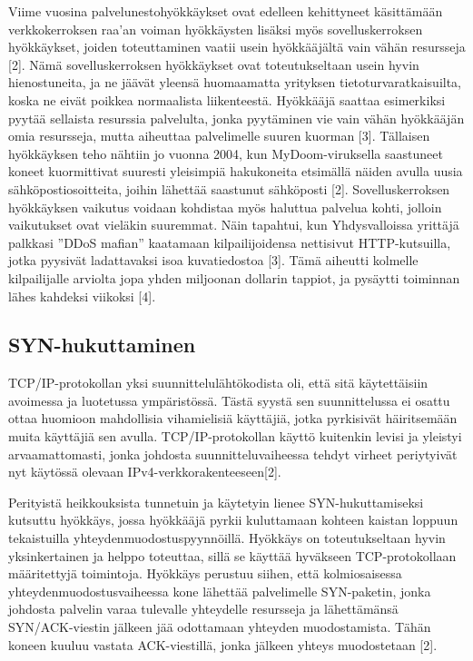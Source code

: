 Viime vuosina palvelunestohyökkäykset ovat edelleen kehittyneet
käsittämään verkkokerroksen raa’an voiman hyökkäysten lisäksi myös
sovelluskerroksen hyökkäykset, joiden toteuttaminen vaatii usein
hyökkääjältä vain vähän resursseja [2]. Nämä sovelluskerroksen
hyökkäykset ovat toteutukseltaan usein hyvin hienostuneita, ja ne
jäävät yleensä huomaamatta yrityksen tietoturvaratkaisuilta, koska ne
eivät poikkea normaalista liikenteestä. Hyökkääjä saattaa esimerkiksi
pyytää sellaista resurssia palvelulta, jonka pyytäminen vie vain vähän
hyökkääjän omia resursseja, mutta aiheuttaa palvelimelle suuren
kuorman [3]. Tällaisen hyökkäyksen teho nähtiin jo vuonna 2004, kun
MyDoom-viruksella saastuneet koneet kuormittivat suuresti yleisimpiä
hakukoneita etsimällä näiden avulla uusia sähköpostiosoitteita, joihin
lähettää saastunut sähköposti [2]. Sovelluskerroksen hyökkäyksen
vaikutus voidaan kohdistaa myös haluttua palvelua kohti, jolloin
vaikutukset ovat vieläkin suuremmat. Näin tapahtui, kun Yhdysvalloissa
yrittäjä palkkasi ”DDoS mafian” kaatamaan kilpailijoidensa nettisivut
HTTP-kutsuilla, jotka pyysivät ladattavaksi isoa kuvatiedostoa
[3]. Tämä aiheutti kolmelle kilpailijalle arviolta jopa yhden
miljoonan dollarin tappiot, ja pysäytti toiminnan lähes kahdeksi
viikoksi [4].

\subsection{SYN-hukuttaminen}

TCP/IP-protokollan yksi suunnittelulähtökodista oli, että sitä
käytettäisiin avoimessa ja luotetussa ympäristössä. Tästä syystä sen
suunnittelussa ei osattu ottaa huomioon mahdollisia vihamielisiä
käyttäjiä, jotka pyrkisivät häiritsemään muita käyttäjiä sen
avulla. TCP/IP-protokollan käyttö kuitenkin levisi ja yleistyi
arvaamattomasti, jonka johdosta suunnitteluvaiheessa tehdyt virheet
periytyivät nyt käytössä olevaan IPv4-verkkorakenteeseen[2].

Perityistä heikkouksista tunnetuin ja käytetyin lienee
SYN-hukuttamiseksi kutsuttu hyökkäys, jossa hyökkääjä pyrkii
kuluttamaan kohteen kaistan loppuun tekaistuilla
yhteydenmuodostuspyynnöillä. Hyökkäys on toteutukseltaan hyvin
yksinkertainen ja helppo toteuttaa, sillä se käyttää hyväkseen
TCP-protokollaan määritettyjä toimintoja. Hyökkäys perustuu siihen,
että kolmiosaisessa yhteydenmuodostusvaiheessa kone lähettää
palvelimelle SYN-paketin, jonka johdosta palvelin varaa tulevalle
yhteydelle resursseja ja lähettämänsä SYN/ACK-viestin jälkeen jää
odottamaan yhteyden muodostamista. Tähän koneen kuuluu vastata
ACK-viestillä, jonka jälkeen yhteys muodostetaan [2].

